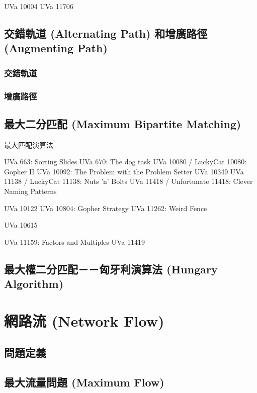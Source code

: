 \documentclass[12pt,a4paper,oneside]{report}
\begin{document}
\begin{CJK}{UTF8}{bkai}
UVa 10004
UVa 11706

\subsection{交錯軌道 (Alternating Path) 和增廣路徑 (Augmenting Path)}

\subsubsection{交錯軌道}

\subsubsection{增廣路徑}

\subsection{最大二分匹配 (Maximum Bipartite Matching)}

\begin{algorithm}
\caption{最大匹配演算法}
\begin{algorithmic}

\end{algorithmic}
\end{algorithm}

UVa 663: Sorting Slides
UVa 670: The dog task
UVa 10080 / LuckyCat 10080: Gopher II
UVa 10092: The Problem with the Problem Setter
UVa 10349
UVa 11138 / LuckyCat 11138: Nuts 'n' Bolts
UVa 11418 / Unfortunate 11418: Clever Naming Patterns

UVa 10122
UVa 10804: Gopher Strategy
UVa 11262: Weird Fence

UVa 10615

UVa 11159: Factors and Multiples
UVa 11419

\subsection{最大權二分匹配－－匈牙利演算法 (Hungary Algorithm)}

\section{網路流 (Network Flow)}
\subsection{問題定義}
\subsection{最大流量問題 (Maximum Flow)}

\end{CJK}
\end{document}
